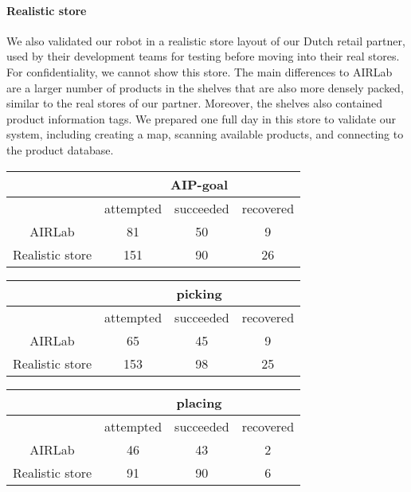 \paragraph{Realistic store}
We also validated our robot in a realistic store layout of our Dutch retail partner, used by their development teams for testing before moving into their real stores.  
For confidentiality, we cannot show this store.
The main differences to AIRLab are a larger number of products in the shelves that are also more densely packed, similar to the real stores of our partner.
Moreover, the shelves also contained product information tags. 
We prepared one full day in this store to validate our system, including creating a map, scanning available products, and connecting to the product database.
\begin{table*}[t]
    \centering
    \caption{Number of attempted, succeeded and recovered
    symbolic action attempts for picking and placing
    (the more complex symbolic actions). Note, that a recovery is
    defined as a successful execution of a symbolic action after a
    failure.
    }
    \label{tab:recoveries}
    \begin{tabular}{c|ccc}
        \toprule
         & \multicolumn{3}{c}{AIP-goal} \\
        \midrule
        & attempted & succeeded & recovered \\
        AIRLab & 81 & 50 & 9 \\
        Realistic store & 151 &  90 & 26 \\
        \bottomrule
    \end{tabular}   
    \begin{tabular}{c|ccc}
        \toprule
        & \multicolumn{3}{c}{picking} \\
        \midrule
        & attempted & succeeded & recovered \\
        AIRLab &  65 & 45 & 9 \\
        Realistic store & 153 & 98 & 25 \\
        \bottomrule
    \end{tabular}   
    \begin{tabular}{c|ccc}
        \toprule
        & \multicolumn{3}{c}{placing} \\
        \midrule
        & attempted & succeeded & recovered \\
        AIRLab &  46 & 43 & 2 \\
        Realistic store & 91 & 90 & 6 \\
        \bottomrule
    \end{tabular}   
\end{table*}
%
